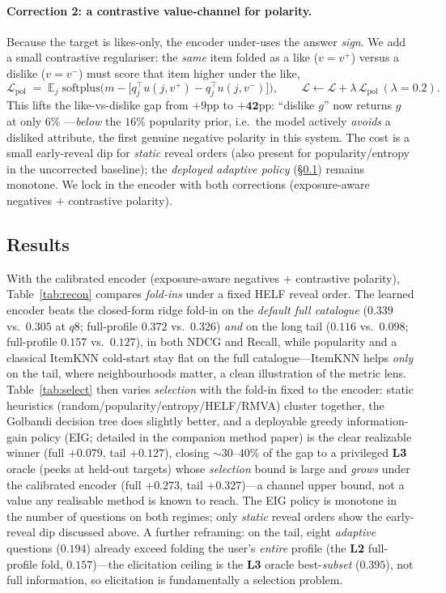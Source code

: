 \documentclass[11pt]{article}
\begin{document}
\paragraph{Correction 2: a contrastive value-channel for polarity.} Because the target is likes-only, the encoder
under-uses the answer \emph{sign}. We add a small contrastive regulariser: the \emph{same} item folded as a like
($v\!=\!v^+$) versus a dislike ($v\!=\!v^-$) must score that item higher under the like,
\[
\mathcal L_{\mathrm{pol}} \;=\; \mathbb{E}_j\;\mathrm{softplus}\!\big(m-\big[q_j^\top u(j,v^+)-q_j^\top u(j,v^-)\big]\big),
\qquad \mathcal L \leftarrow \mathcal L + \lambda\,\mathcal L_{\mathrm{pol}}\ (\lambda{=}0.2).
\]
This lifts the like-vs-dislike gap from $+9$pp to $\mathbf{+42}$pp: ``dislike $g$'' now returns $g$ at only $6\%$
---\emph{below} the $16\%$ popularity prior, i.e.\ the model actively \emph{avoids} a disliked attribute, the first
genuine negative polarity in this system. The cost is a small early-reveal dip for \emph{static} reveal orders
(also present for popularity/entropy in the uncorrected baseline); the \emph{deployed adaptive policy} (\S\ref{sec:reconresults})
remains monotone. We lock in the encoder with both corrections (exposure-aware negatives $+$ contrastive polarity).

\subsection{Results}\label{sec:reconresults}
With the calibrated encoder (exposure-aware negatives $+$ contrastive polarity), Table~\ref{tab:recon} compares
\emph{fold-ins} under a fixed HELF reveal order. The learned encoder beats the closed-form ridge fold-in on the
\emph{default full catalogue} ($0.339$ vs.\ $0.305$ at $q8$; full-profile $0.372$ vs.\ $0.326$) \emph{and} on the
long tail ($0.116$ vs.\ $0.098$; full-profile $0.157$ vs.\ $0.127$), in both NDCG and Recall, while popularity and a
classical ItemKNN cold-start stay flat on the full catalogue---ItemKNN helps \emph{only} on the tail, where
neighbourhoods matter, a clean illustration of the metric lens. Table~\ref{tab:select} then varies \emph{selection}
with the fold-in fixed to the encoder: static heuristics (random/popularity/entropy/HELF/RMVA) cluster together, the
Golbandi decision tree does slightly better, and a deployable greedy information-gain policy (EIG; detailed in the
companion method paper) is the clear realizable winner (full $+0.079$, tail $+0.127$), closing $\sim\!30$--$40\%$ of
the gap to a privileged \textbf{L3} oracle (peeks at held-out targets) whose \emph{selection} bound is large and
\emph{grows} under the calibrated encoder (full $+0.273$, tail $+0.327$)---a channel upper bound, not a value any
realisable method is known to reach. The EIG policy is monotone in the number of questions on both regimes; only \emph{static}
reveal orders show the early-reveal dip discussed above. A further reframing: on the tail, eight \emph{adaptive}
questions ($0.194$) already exceed folding the user's \emph{entire} profile (the \textbf{L2} full-profile fold, $0.157$)---the elicitation ceiling is the
\textbf{L3} oracle best-\emph{subset} ($0.395$), not full information, so elicitation is fundamentally a selection problem.
\end{document}
